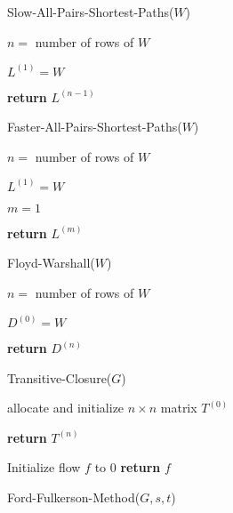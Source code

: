 \documentclass[7pt]{article}
\begin{document}
\begin{figure*}[ttt!]
\begin{minipage}[t]{.25\linewidth}
    \begin{algorithm}[H]
    \caption{Slow-All-Pairs-Shortest-Paths($W$)}
      $n=$ number of rows of $W$ 

      $L^{(1)}=W$ 

      {\bf return} $L^{(n-1)}$ 
    \end{algorithm}

  \end{minipage}
  \begin{minipage}[t]{.25\linewidth}
    \vspace{0pt}

    \begin{algorithm}[H]
    \caption{Faster-All-Pairs-Shortest-Paths($W$)}
      $n=$ number of rows of $W$ 

      $L^{(1)}=W$ 

      $m=1$ 

      {\bf return} $L^{(m)}$ 
    \end{algorithm}


    \begin{algorithm}[H]
    \caption{Floyd-Warshall($W$)}
      $n=$ number of rows of $W$ 

      $D^{(0)}=W$ 

      {\bf return} $D^{(n)}$ 
    \end{algorithm}
    
    \begin{algorithm}[H]
    \caption{Transitive-Closure($G$)}
      allocate and initialize $n \times n$ matrix $T^{(0)}$ 

      {\bf return} $T^{(n)}$ 
    \end{algorithm}

   \begin{algorithm}[H]
   \caption{Ford-Fulkerson-Method($G,s,t$)}
    Initialize flow $f$ to 0 \;
     {\bf return} $f$ \;
   \end{algorithm}
    

\end{minipage}
\end{figure*}
\end{document}
